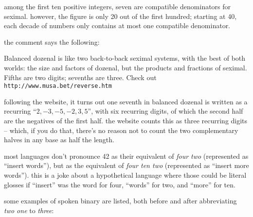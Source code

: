 \documentclass[../footnotes.tex]{subfiles}
\begin{document}
 among the first ten positive integers, seven are compatible denominators for seximal. however, the figure is only 20 out of the first hundred; starting at 40, each decade of numbers only contains at most one compatible denominator.

 the comment says the following:

\begin{quoting}
    Balanced dozenal is like two back-to-back seximal systems, with the best of both worlds: the size and factors of dozenal, but the products and fractions of seximal. Fifths are two digits; sevenths are three. Check out \verb#http://www.musa.bet/reverse.htm#
\end{quoting}
following the website, it turns out one seventh in balanced dozenal is written as a recurring ``$2, -3, -5, -2, 3, 5$'', with six recurring digits, of which the second half are the negatives of the first half. the website counts this as three recurring digits -- which, if you do that, there's no reason not to count the two complementary halves in any base as half the length.

 most languages don't pronounce 42 as their equivalent of {\it four two} (represented as ``insert words''), but as the equivalent of {\it four ten two} (represented as ``insert more words''). this is a joke about a hypothetical language where those could be literal glosses if ``insert'' was the word for four, ``words'' for two, and ``more'' for ten.

 some examples of spoken binary are listed, both before and after abbreviating {\it two one} to {\it three}:
\end{document}
